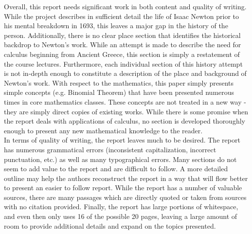 \documentclass[11pt]{article}
\begin{document}
Overall, this report needs significant work in both content and quality of writing. While the project describes in sufficient detail the life of Isaac Newton prior to his mental breakdown in 1693, this leaves a major gap in the history of the person. Additionally, there is no clear place section that identifies the historical backdrop to Newton's work. While an attempt is made to describe the need for calculus beginning from Ancient Greece, this section is simply a restatement of the course lectures. Furthermore, each individual section of this history attempt is not in-depth enough to constitute a description of the place and background of Newton's work. With respect to the mathematics, this paper simply presents simple concepts (e.g. Binomial Theorem) that have been presented numerous times in core mathematics classes. These concepts are not treated in a new way - they are simply direct copies of existing works. While there is some promise when the report deals with applications of calculus, no section is developed thoroughly enough to present any new mathematical knowledge to the reader.\\

In terms of quality of writing, the report leaves much to be desired. The report has numerous grammatical errors (inconsistent capitalization, incorrect punctuation, etc.) as well as many typographical errors. Many sections do not seem to add value to the report and are difficult to follow. A more detailed outline may help the authors reconstruct the report in a way that will flow better to present an easier to follow report. While the report has a number of valuable sources, there are many passages which are directly quoted or taken from sources with no citation provided. Finally, the report has large portions of whitespace, and even then only uses 16 of the possible 20 pages, leaving a large amount of room to provide additional details and expand on the topics presented.

\newpage
\end{document}
